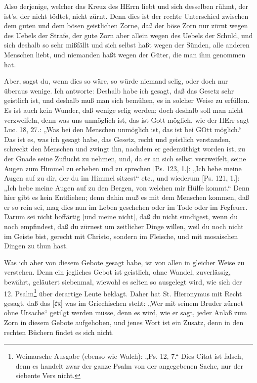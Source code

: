 Also derjenige, welcher das Kreuz des HErrn liebt und sich desselben rühmt, der ist’s, der nicht tödtet, nicht zürnt. Denn dies ist der rechte Unterschied zwischen dem guten und dem bösen geistlichen Zorne, daß der böse Zorn nur zürnt wegen des Uebels der Strafe, der gute Zorn aber allein wegen des Uebels der Schuld, und sich deshalb so sehr mißfällt und sich selbst haßt wegen der Sünden, alle anderen Menschen liebt, und niemanden haßt wegen der Güter, die man ihm genommen hat.

Aber, sagst du, wenn dies so wäre, so würde niemand selig, oder doch nur überaus wenige. Ich antworte: Deshalb habe ich gesagt, daß das Gesetz sehr geistlich ist, und deshalb muß man sich bemühen, es in solcher Weise zu erfüllen. Es ist auch kein Wunder, daß wenige selig werden; doch deshalb soll man nicht verzweifeln, denn was uns unmöglich ist, das ist Gott möglich, wie der HErr sagt Luc. 18, 27.: „Was bei den Menschen unmöglich ist, das ist bei GOtt möglich.“ Das ist es, was ich gesagt habe, das Gesetz, recht und geistlich verstanden, schreckt den Menschen und zwingt ihn, nachdem er gedemüthigt worden ist, zu der Gnade seine Zuflucht zu nehmen, und, da er an sich selbst verzweifelt, seine Augen zum Himmel zu erheben und zu sprechen [Ps. 123, 1.]: „Ich hebe meine Augen auf zu dir, der du im Himmel sitzest“ etc., und wiederum [Ps. 121, 1.]: „Ich hebe meine Augen auf zu den Bergen, von welchen mir Hülfe kommt.“ Denn hier gibt es kein Entfliehen; denn dahin muß es mit dem Menschen kommen, daß er so rein sei, mag dies nun im Leben geschehen oder im Tode oder im Fegfeuer. Darum sei nicht hoffärtig [und meine nicht], daß du nicht sündigest, wenn du noch empfindest, daß du zürnest um zeitlicher Dinge willen, weil du noch nicht im Geiste bist, gerecht mit Christo, sondern im Fleische, und mit mosaischen Dingen zu thun hast.

Was ich aber von diesem Gebote gesagt habe, ist von allen in gleicher Weise zu verstehen. Denn ein jegliches Gebot ist geistlich, ohne Wandel, zuverlässig, bewährt, geläutert siebenmal, wiewohl es selten so ausgelegt wird, wie sich der 12. Psalm\footnote{Weimarsche Ausgabe (ebenso wie Walch): „Ps. 12, 7.“ Dies Citat ist falsch, denn es handelt zwar der ganze Psalm von der angegebenen Sache, nur der siebente Vers nicht.} über derartige Leute beklagt. Daher hat St. Hieronymus mit Recht gesagt, daß das [ἐκ] was im Griechischen steht: „Wer mit seinem Bruder zürnet ohne Ursache“ getilgt werden müsse, denn es wird, wie er sagt, jeder Anlaß zum Zorn in diesem Gebote aufgehoben, und jenes Wort ist ein Zusatz, denn in den rechten Büchern findet es sich nicht.

